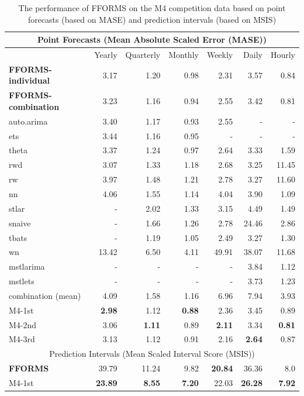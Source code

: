 \documentclass[11pt,a4paper,]{article}
\begin{document}
\begin{table}[!h]
\centering\scriptsize\tabcolsep=0.12cm
\begin{threeparttable}
\caption{The performance of FFORMS on the M4 competition data based on point forecasts (based on MASE) and prediction intervals (based on MSIS)}
\label{forecasts}
\begin{tabular}{l|rrrrrr}
\hline
\multicolumn{7}{c}{Point Forecasts (Mean Absolute Scaled Error (MASE))} \\\hline
 & Yearly & Quarterly & Monthly & Weekly & Daily & Hourly \\\hline
\bf{FFORMS-individual} & 3.17 &  1.20 &  0.98&  2.31& 3.57 &  0.84\\
\bf{FFORMS-combination} & 3.23 &  1.16 &  0.94&  2.55& 3.42 &  0.81\\
auto.arima & 3.40 &1.17  &0.93  & 2.55 &  -& - \\
ets & 3.44 &  1.16& 0.95 &  -&-  &  -\\
theta & 3.37 &1.24  & 0.97 &2.64  & 3.33 & 1.59 \\
rwd & 3.07 & 1.33 & 1.18  & 2.68  & 3.25 & 11.45 \\
rw & 3.97 & 1.48 & 1.21  &2.78  & 3.27 & 11.60 \\
nn & 4.06 & 1.55 &  1.14 &4.04 & 3.90 & 1.09 \\
stlar & - & 2.02 &  1.33& 3.15 & 4.49 & 1.49 \\
snaive & - &  1.66& 1.26 &  2.78& 24.46 & 2.86 \\
tbats & - & 1.19 &  1.05& 2.49 & 3.27 &  1.30\\
wn & 13.42 &  6.50&  4.11&  49.91& 38.07 & 11.68 \\
mstlarima & - & - &  - & - & 3.84 &  1.12\\
mstlets & - &  - &  - &  - & 3.73 &  1.23\\
combination (mean) & 4.09 & 1.58 &  1.16&6.96  & 7.94 & 3.93 \\\hline
M4-1st & \bf{2.98} & 1.12 &  \bf{0.88}& 2.36 & 3.45 & 0.89\\
M4-2nd & 3.06 & \bf{1.11} &  0.89& \bf{2.11} & 3.34 & \bf{0.81}\\
M4-3rd & 3.13 & 1.12 &  0.91& 2.16 & \bf{2.64} & 0.87\\\hline
\multicolumn{7}{c}{Prediction Intervals (Mean Scaled Interval Score (MSIS))} \\\hline
\bf{FFORMS} & 39.79 &  11.24 &  9.82&  \bf{20.84}& 36.36 & 8.0 \\
M4-1st & \bf{23.89} & \bf{8.55} &  \bf{7.20} & 22.03 & \bf{26.28} & \bf{7.92}\\

\end{tabular}
\end{threeparttable}
\end{table}
\end{document}
